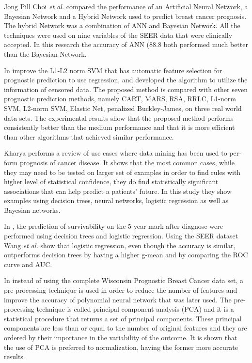 Jong Pill Choi \emph{et al.} compared the performance of an Artificial Neural Network, a Bayesian Network and a Hybrid Network used to predict breast
 cancer prognosis. The hybrid Network was a combination of ANN and Bayesian Network. All the techniques were used on nine variables of the
 SEER data that were clinically accepted. In this research the accuracy of ANN (88.8%
 both performed much better than the Bayesian Network. \cite{Choi2009}

In \cite{Sun2011} improve the L1-L2 norm SVM that has automatic feature selection for prognostic prediction to use regression, and developed
 the algorithm to utilize the information of censored data. The proposed method is compared with other seven prognostic prediction methods,
 namely CART, MARS, RSA, RRLC, L1-norm SVM, L2-norm SVM, Elastic Net, penalized Buckley-James, on three real world data sets. The experimental 
 results show that the proposed method performs consistently better than the medium performance and that it is more efficient than other
 algorithms that achieved similar performance.

Kharya performs a review of use cases where data mining has been used to per-form prognosis of cancer disease. It shows that the most 
common cases, while they may need to be tested on larger set of examples in order to find rules with higher level of statistical confidence, 
they do find statistically significant associations that can help predict a patients’ future. In this study they show examples using decision
 trees, neural networks, logistic regression as well as Bayesian networks. \cite{Kharya2012}

In \cite{Wang2012}, the prediction of survivability on the 5 year mark after diagnose were performed using decision trees and logistic regression.
 Using the SEER dataset Wang \emph{et al.} show that logistic regression, even though the accuracy is similar, outperforms decision trees by having a
 higher g-mean and by comparing the ROC curve and AUC.

In \cite{Saxena2013} instead of using the complete Wisconsin Prognostic Breast Cancer data set, a pre-processing technique 
is used in order to reduce the number of features and improve the accuracy of polynomial neural network that was later used. 
The pre-processing technique is called principal component analysis (PCA) and it is a statistical procedure that returns a set
 of principal components. These principal components are less than or equal to the number of original features and they are ordered 
 by their importance in the variability of the outcome. It is shown that the use of PCA is preferred to normalization, having the 
 former more accurate results.

